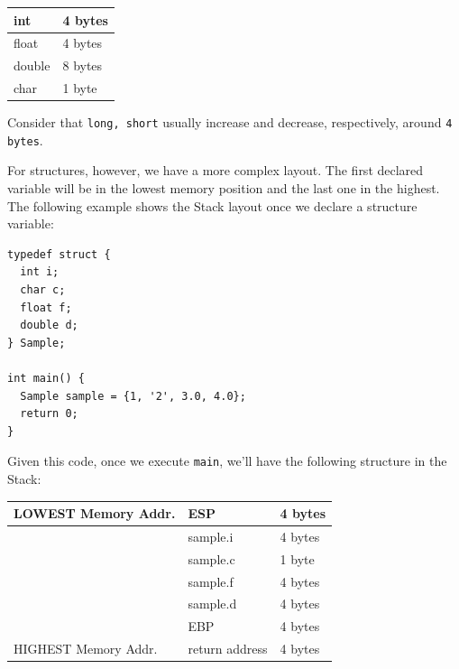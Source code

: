 \documentclass[11pt]{article}
\begin{document}
\begin{center}
\begin{tabular}{l|l}
\hline
int & 4 bytes\\
\hline
float & 4 bytes\\
\hline
double & 8 bytes\\
\hline
char & 1 byte\\
\hline
\end{tabular}
\end{center}

Consider that \texttt{long, short} usually increase and decrease, respectively, around \texttt{4 bytes}.

For structures, however, we have a more complex layout. The first declared variable will be in the lowest memory position and the last one in the highest. The following example shows the Stack layout once we declare a structure variable:

\begin{verbatim}
typedef struct {
  int i;
  char c;
  float f;
  double d;
} Sample;

int main() {
  Sample sample = {1, '2', 3.0, 4.0};
  return 0;
}
\end{verbatim}

Given this code, once we execute \texttt{main}, we'll have the following structure in the Stack:

\begin{center}
\begin{tabular}{l|l|l}
\hline
LOWEST Memory Addr. & ESP & 4 bytes\\
\hline
 & sample.i & 4 bytes\\
\hline
 & sample.c & 1 byte\\
\hline
 & sample.f & 4 bytes\\
\hline
 & sample.d & 4 bytes\\
\hline
 & EBP & 4 bytes\\
\hline
HIGHEST Memory Addr. & return address & 4 bytes\\
\hline
\end{tabular}
\end{center}



\end{document}
